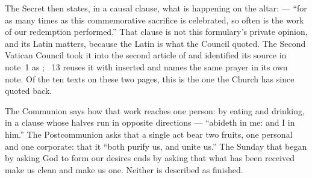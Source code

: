 The Secret then states, in a causal clause, what is happening on the altar:
 --- ``for as many times as this commemorative
sacrifice is celebrated, so often is the work of our redemption performed.''
That clause is not this formulary's private opinion, and its Latin matters,
because the Latin is what the Council quoted. The Second Vatican Council took
it into the second article of  and identified its
source in note~1 as ; ~13 reuses it with
 inserted and names the same prayer in its own note. Of the
ten texts on these two pages, this is the one the Church has since quoted
back.

The Communion says how that work reaches one person: by eating and drinking,
in a clause whose halves run in opposite directions --- ``abideth in me: and I
in him.'' The Postcommunion asks that a single act bear two fruits, one
personal and one corporate: that it ``both purify us, and unite us.'' The
Sunday that began by asking God to form our desires ends by asking that what
has been received make us clean and make us one. Neither is described as
finished.

\label{triptych:brief-synthesis:end}
\clearpage
